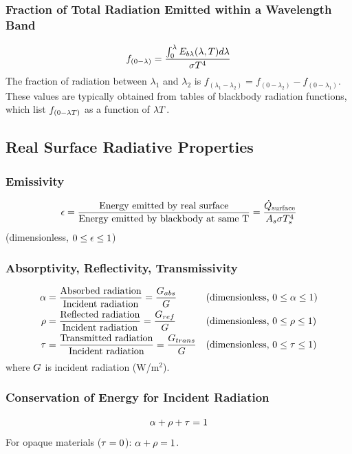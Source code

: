 \subsubsection*{Fraction of Total Radiation Emitted within a Wavelength Band}
\begin{equation}
    f_{(0-\lambda)} = \frac{\int_0^{\lambda} E_{b\lambda}(\lambda, T) d\lambda}{\sigma T^4}
\end{equation}
The fraction of radiation between $\lambda_1$ and $\lambda_2$ is $f_{(\lambda_1-\lambda_2)} = f_{(0-\lambda_2)} - f_{(0-\lambda_1)}$.
These values are typically obtained from tables of blackbody radiation functions, which list $f_{(0-\lambda T)}$ as a function of $\lambda T$.

\subsection{Real Surface Radiative Properties}
\subsubsection*{Emissivity}
\begin{equation}
    \epsilon = \frac{\text{Energy emitted by real surface}}{\text{Energy emitted by blackbody at same T}} = \frac{\dot{Q}_{\text{surface}}}{A_s \sigma T_s^4}
\end{equation}
(dimensionless, $0 \le \epsilon \le 1$)

\subsubsection*{Absorptivity, Reflectivity, Transmissivity}
\begin{align}
    \alpha &= \frac{\text{Absorbed radiation}}{\text{Incident radiation}} = \frac{G_{abs}}{G} && \text{(dimensionless, } 0 \le \alpha \le 1) \\
    \rho &= \frac{\text{Reflected radiation}}{\text{Incident radiation}} = \frac{G_{ref}}{G} && \text{(dimensionless, } 0 \le \rho \le 1) \\
    \tau &= \frac{\text{Transmitted radiation}}{\text{Incident radiation}} = \frac{G_{trans}}{G} && \text{(dimensionless, } 0 \le \tau \le 1)
\end{align}
where $G$ is incident radiation (W/m$^2$).

\subsubsection*{Conservation of Energy for Incident Radiation}
\begin{equation}
    \alpha + \rho + \tau = 1
\end{equation}
For opaque materials ($\tau = 0$): $\alpha + \rho = 1$.

